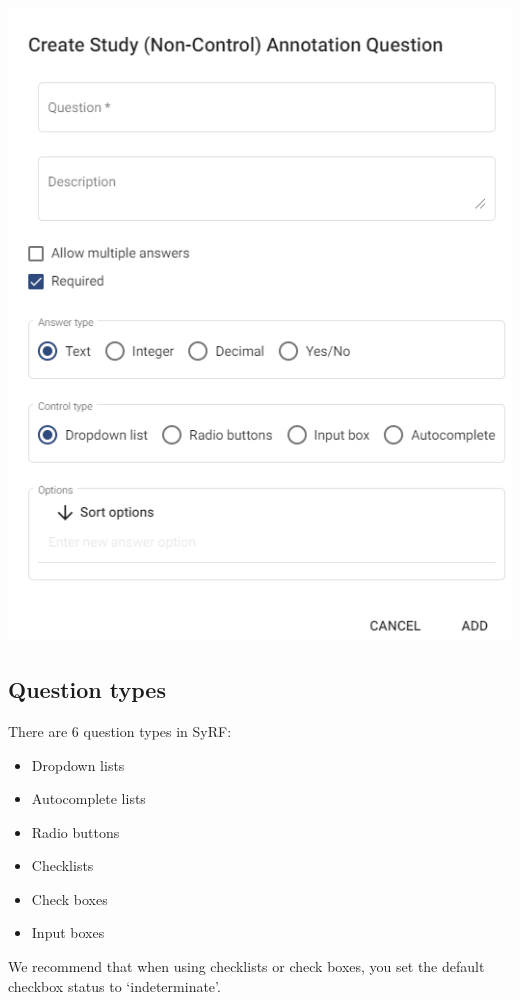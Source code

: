 \documentclass[
]{book}
\providecommand{\tightlist}{%
  \setlength{\itemsep}{0pt}\setlength{\parskip}{0pt}}
\begin{document}
\includegraphics[width=7.26in]{figs/Fig_Question_dialogue}

\hypertarget{question-types}{%
\subsection{Question types}\label{question-types}}

There are 6 question types in SyRF:

\begin{itemize}
\tightlist
\item
  Dropdown lists
\item
  Autocomplete lists
\item
  Radio buttons
\item
  Checklists
\item
  Check boxes
\item
  Input boxes
\end{itemize}

We recommend that when using checklists or check boxes, you set the default checkbox status to `indeterminate'.
\end{document}
